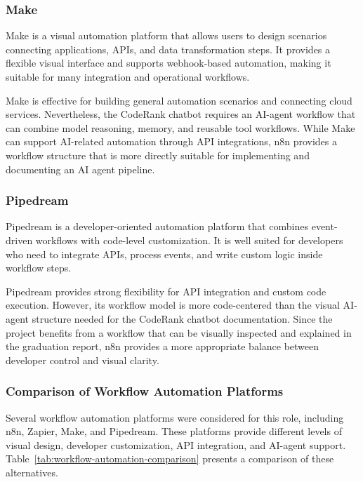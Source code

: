 \subsubsection{Make}

Make is a visual automation platform that allows users to design scenarios connecting applications, APIs, and data transformation steps. It provides a flexible visual interface and supports webhook-based automation, making it suitable for many integration and operational workflows.\cite{make_platform}

Make is effective for building general automation scenarios and connecting cloud services. Nevertheless, the CodeRank chatbot requires an AI-agent workflow that can combine model reasoning, memory, and reusable tool workflows. While Make can support AI-related automation through API integrations, n8n provides a workflow structure that is more directly suitable for implementing and documenting an AI agent pipeline.

\subsubsection{Pipedream}

Pipedream is a developer-oriented automation platform that combines event-driven workflows with code-level customization. It is well suited for developers who need to integrate APIs, process events, and write custom logic inside workflow steps.\cite{pipedream_docs}

Pipedream provides strong flexibility for API integration and custom code execution. However, its workflow model is more code-centered than the visual AI-agent structure needed for the CodeRank chatbot documentation. Since the project benefits from a workflow that can be visually inspected and explained in the graduation report, n8n provides a more appropriate balance between developer control and visual clarity.

\subsubsection{Comparison of Workflow Automation Platforms}

Several workflow automation platforms were considered for this role, including n8n, Zapier, Make, and Pipedream. These platforms provide different levels of visual design, developer customization, API integration, and AI-agent support. Table~\ref{tab:workflow-automation-comparison} presents a comparison of these alternatives.

